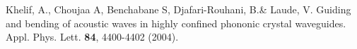 \documentclass[aps,preprint,onecolumn,showpacs,superscriptaddress,groupedaddress]{revtex4}  %
\begin{document}
\begin{thebibliography}{99}
	Khelif, A., Choujaa A, Benchabane S, Djafari-Rouhani, B.\& Laude, V.  Guiding and bending of acoustic waves in highly confined phononic crystal waveguides. Appl. Phys. Lett. \textbf{84}, 4400-4402 (2004).

\end{thebibliography}
\end{document}
